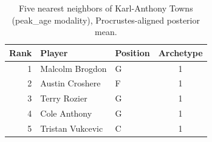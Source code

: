 \begin{table}[htbp]
  \centering\small
  \begin{tabular}{rllc}
    \toprule
    Rank & Player & Position & Archetype \\
    \midrule
    1 & Malcolm Brogdon & G & 1 \\
    2 & Austin Croshere & F & 1 \\
    3 & Terry Rozier & G & 1 \\
    4 & Cole Anthony & G & 1 \\
    5 & Tristan Vukcevic & C & 1 \\
    \bottomrule
  \end{tabular}
  \caption{Five nearest neighbors of Karl-Anthony Towns (peak_age modality), Procrustes-aligned posterior mean.}
  \label{tab:Karl_Anthony_Towns_neighbors_peak_age}
\end{table}

